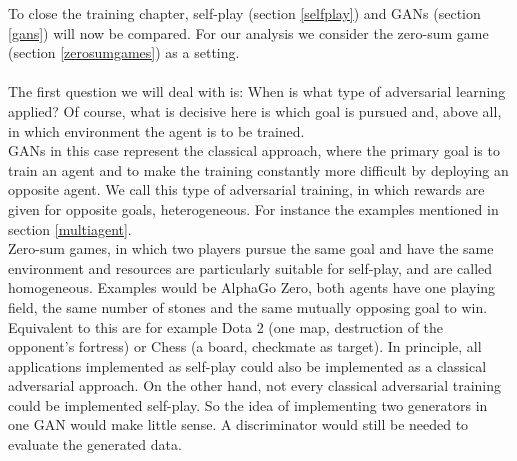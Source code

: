  
 To close the training chapter, self-play (section \ref{selfplay}) and GANs (section \ref{gans}) will now be compared.
 For our analysis we consider the zero-sum game (section \ref{zerosumgames}) as a setting. \\
\\
The first question we will deal with is: When is what type of adversarial learning applied?
Of course, what is decisive here is which goal is pursued and, above all, in which environment the agent is to be trained.\\
GANs in this case represent the classical approach, where the primary goal is to train an agent and to make the training constantly more difficult by deploying an opposite agent. We call this type of adversarial training, in which rewards are given for opposite goals, heterogeneous. For instance the examples mentioned in section \ref{multiagent}.\\
Zero-sum games, in which two players pursue the same goal and have the same environment and resources are particularly suitable for self-play, and are called homogeneous. Examples would be AlphaGo Zero, both agents have one playing field, the same number of stones and the same mutually opposing goal to win. Equivalent to this are for example Dota 2 (one map, destruction of the opponent's fortress) or Chess (a board, checkmate as target).
In principle, all applications implemented as self-play could also be implemented as a classical adversarial approach. On the other hand, not every classical adversarial training could be implemented self-play. So the idea of implementing two generators in one GAN would make little sense. A discriminator would still be needed to evaluate the generated data.\\
